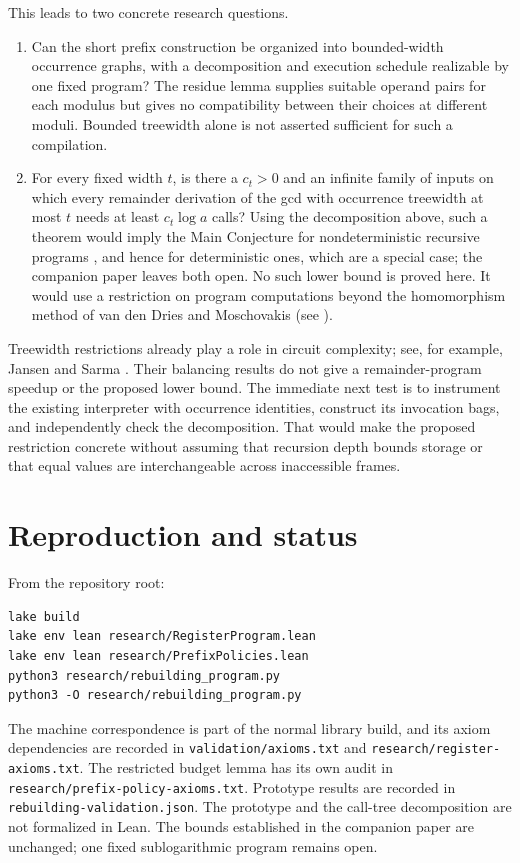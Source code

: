 \documentclass[11pt]{article}
\begin{document}
This leads to two concrete research questions.
\begin{enumerate}
\item Can the short prefix construction be organized into bounded-width
occurrence graphs, with a decomposition and execution schedule realizable by
one fixed program? The residue lemma supplies suitable operand pairs for each
modulus but gives no compatibility between their choices at different moduli.
Bounded treewidth alone is not asserted sufficient for such a compilation.
\item For every fixed width $t$, is there a $c_t>0$ and an infinite family of
inputs on which every remainder derivation of the gcd with occurrence
treewidth at most $t$ needs at least $c_t\log a$ calls? Using the decomposition
above, such a theorem would imply the Main Conjecture for nondeterministic
recursive programs \cite{book}, and hence for deterministic ones, which are a
special case; the companion paper \cite{companion} leaves both open. No such lower bound is proved here. It would use a
restriction on program computations beyond the homomorphism method of van den
Dries and Moschovakis (see \cite{companion}).
\end{enumerate}

Treewidth restrictions already play a role in circuit complexity; see, for
example, Jansen and Sarma \cite{js}. Their balancing results do not give a
remainder-program speedup or the proposed lower bound. The immediate next
test is to instrument the existing interpreter with occurrence identities,
construct its invocation bags, and independently check the decomposition.
That would make the proposed restriction concrete without assuming that
recursion depth bounds storage or that equal values are interchangeable
across inaccessible frames.

\section{Reproduction and status}
From the repository root:
\begin{verbatim}
lake build
lake env lean research/RegisterProgram.lean
lake env lean research/PrefixPolicies.lean
python3 research/rebuilding_program.py
python3 -O research/rebuilding_program.py
\end{verbatim}
The machine correspondence is part of the normal library build, and its
axiom dependencies are recorded in \texttt{validation/axioms.txt} and
\texttt{research/register-axioms.txt}. The restricted budget lemma has its own
audit in \texttt{research/prefix-policy-axioms.txt}. Prototype results are recorded in
\texttt{rebuilding-validation.json}. The prototype and the call-tree
decomposition are not formalized in Lean. The bounds established in the
companion paper \cite{companion} are unchanged; one fixed sublogarithmic
program remains open.
\end{document}
